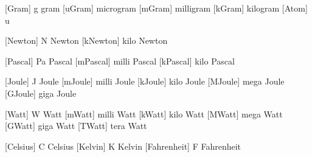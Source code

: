 \setuplabeltext
  [\s!en]
  [u:rps=revolutions per second,
   u:rpm=revolutions per minute]

\setuplabeltext
  [\s!de]
  [u:rps=Umdrehungen pro Sekunde,
   u:rpm=Umdrehungen pro Minute]

\setuplabeltext
  [\s!it]
  [u:rps=giri al secondo,
   u:rpm=giri al minuto]


 [Gram]    {g}              {gram}
 [uGram]   {\Micro \Gram}   {microgram}
 [mGram]   {\Milli \Gram}   {milligram}
 [kGram]   {\Kilo  \Gram}   {kilogram}
 [Atom]    {u}              {}

 [Newton]  {N}              {Newton}
 [kNewton] {\Kilo \Newton}  {kilo Newton}

 [Pascal]  {Pa}             {Pascal}
 [mPascal] {\Milli \Pascal} {milli Pascal}
 [kPascal] {\Kilo  \Pascal} {kilo Pascal}

\setuplabeltext
  [\s!nl]
  [u:u=atomaire massa eenheid]

\setuplabeltext
  [\s!en]
  [u:u=atom mass unit]

\setuplabeltext
  [\s!de]
  [u:u=Atomare Masseneinheit]

\setuplabeltext
  [\s!it]
  [u:u=unit\`a di massa atomica]


 [Joule]  {J}             {Joule}
 [mJoule] {\Milli \Joule} {milli Joule}
 [kJoule] {\Kilo  \Joule} {kilo Joule}
 [MJoule] {\Mega  \Joule} {mega Joule}
 [GJoule] {\Giga  \Joule} {giga Joule}

 [Watt]  {W}              {Watt}
 [mWatt] {\Milli \Watt}   {milli Watt}
 [kWatt] {\Kilo  \Watt}   {kilo Watt}
 [MWatt] {\Mega  \Watt}   {mega Watt}
 [GWatt] {\Giga  \Watt}   {giga Watt}
 [TWatt] {\Tera  \Watt}   {tera Watt}


 [Celsius]    {C} {Celsius}
 [Kelvin]     {K} {Kelvin}
 [Fahrenheit] {F} {Fahrenheit}

